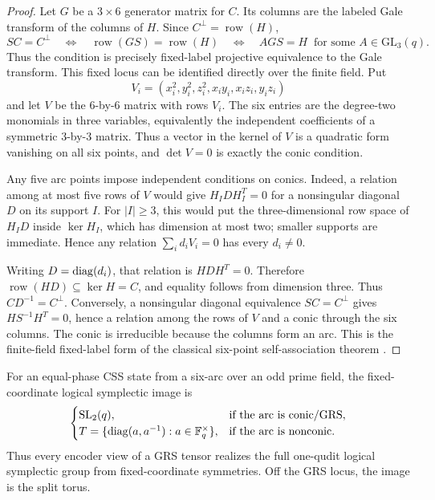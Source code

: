 \begin{proof}
Let \(G\) be a \(3\times6\) generator matrix for \(C\).  Its columns are
the labeled Gale transform of the columns of \(H\).  Since
\(C^\perp=\operatorname{row}(H)\),
\[
 SC=C^\perp
 \quad\Longleftrightarrow\quad
 \operatorname{row}(GS)=\operatorname{row}(H)
 \quad\Longleftrightarrow\quad
 AGS=H\ \text{ for some }A\in\mathrm{GL}_3(q).
\]
Thus the condition is precisely fixed-label projective equivalence to the
Gale transform.  This fixed locus can be identified directly over the finite
field.  Put
\[
 V_i=(x_i^2,y_i^2,z_i^2,x_iy_i,x_iz_i,y_iz_i)
\]
and let \(V\) be the \(6\)-by-\(6\) matrix with rows \(V_i\).  The six
entries are the degree-two monomials in three variables, equivalently the
independent coefficients of a symmetric \(3\)-by-\(3\) matrix.  Thus a
vector in the kernel of \(V\) is a quadratic form vanishing on all six
points, and \(\det V=0\) is exactly the conic condition.

Any five arc points impose independent conditions on conics.  Indeed, a
relation among at most five rows of \(V\) would give
\(H_I D H_I^T=0\) for a nonsingular diagonal \(D\) on its support \(I\).
For \(|I|\geq3\), this would put the three-dimensional row space of
\(H_I D\) inside \(\ker H_I\), which has dimension at most two; smaller
supports are immediate.  Hence any relation
\(\sum_i d_i V_i=0\) has every \(d_i\ne0\).

Writing \(D=\operatorname{diag}(d_i)\), that relation is \(HDH^T=0\).  Therefore
\(\operatorname{row}(HD)\subseteq\ker H=C\), and equality follows from
dimension three.  Thus \(CD^{-1}=C^\perp\).  Conversely, a nonsingular
diagonal equivalence \(SC=C^\perp\) gives
\(HS^{-1}H^T=0\), hence a relation among the rows of \(V\) and a conic
through the six columns.  The conic is irreducible because the columns form
an arc.  This is the finite-field fixed-label form of the classical
six-point self-association theorem
\cite[Section~2.3]{HowardMillsonSnowdenVakil2008}.
\end{proof}

\begin{theorem}
\label{thm:logical-phase}
For an equal-phase CSS state from a six-arc over an odd prime field, the
fixed-coordinate logical symplectic image is
\begin{equation}\label{eq:six-point-linear-logical-group}
\begin{cases}
\mathrm{SL}_2(q),&\text{if the arc is conic/GRS},\\
T=\{\operatorname{diag}(a,a^{-1}):a\in\mathbb F_q^\times\},&\text{if the arc is nonconic}.
\end{cases}
\end{equation}
Thus every encoder view of a GRS tensor realizes the full one-qudit logical
symplectic group from fixed-coordinate symmetries.  Off the GRS locus, the
image is the split torus.
\end{theorem}

